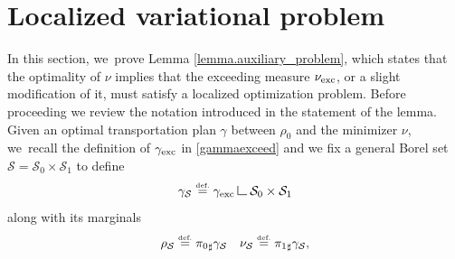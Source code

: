 \documentclass[JEP,XML,SOM,Unicode,NoFloatCountersInSection,published]{cedram}
\theoremstyle{definition}
\newcommand{\eqdef}{\ensuremath{\stackrel{\mbox{\upshape\tiny def.}}{=}}}
\newcommand\LM[1]{\hbox{\vrule width.5pt \vbox to#1pt{\vfill \hrule width#1pt height.5pt}}}
\newcommand\LL{{\mathchoice {\>\LM7\>}{\>\LM7\>}{\,\LM5\,}{\,\LM{3.35}\,}}}
\newcommand{\mres}{\LL}
\newcommand{\nuexc}{\nu_{\textup{exc}}}
\newcommand{\gammaexc}{\gamma_{\textup{exc}}}
\begin{document}
\appendix

\section{Localized variational problem}\label{appendix.localized_variational_problem}
In this section, we~prove Lemma \ref{lemma.auxiliary_problem}, which states that the optimality of $\nu$ implies that the exceeding measure $\nuexc$, or a slight modification of it, must satisfy a localized optimization problem. Before proceeding we review the notation introduced in the statement of the lemma. Given an optimal transportation plan $\gamma$ between $\rho_0$ and the minimizer $\nu$, we~recall the definition of $\gammaexc$ in \eqref{gammaexceed} and we fix a general Borel set $\mathcal{S} = \mathcal{S}_0 \times \mathcal{S}_1$ to define
\[
\gamma_{\mathcal{S}} \eqdef \gammaexc \mres \mathcal{S}_0\times\mathcal{S}_1
\]
along with its marginals
\[
\rho_{\mathcal{S}} \eqdef {\pi_{0}}_\sharp\gamma_\mathcal{S}
\quad \nu_{\mathcal{S}} \eqdef {\pi_{1}}_\sharp\gamma_{\mathcal{S}},
\]
\end{document}
